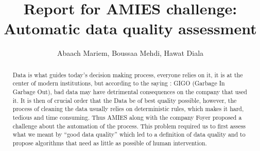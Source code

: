 \documentclass{article}
\title{\Large Report for AMIES challenge: Automatic data quality assessment}
\author{Abaach Mariem, Boussaa Mehdi, Hawat Diala}
\date{}
\begin{document}
\maketitle

\begin{abstract}
    Data is what guides today's decision making process, everyone relies on it, it is at the center of modern institutions, but according to the saying : GIGO (Garbage In Garbage Out), bad data may have detrimental consequences on the company that used it.  It is then of crucial order that the Data be of best quality possible, however, the process of cleaning the data usually relies on deterministic rules, which makes it hard, tedious and time consuming. Thus AMIES along with the company Foyer proposed a challenge about the automation of the process. This problem required us to first assess what we meant by ``good data quality'' which led to a definition of data quality and to propose algorithms that need as little as possible of human intervention.
\end{abstract}
\end{document}
